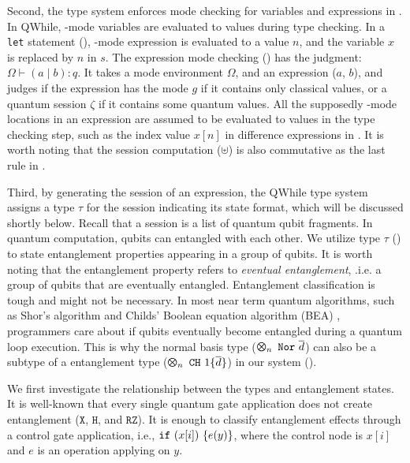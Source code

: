 Second, the type system enforces mode checking for variables and expressions in .
In QWhile, \cmode-mode variables are evaluated to values during type checking.
In a \texttt{let} statement (),
\cmode-mode expression is evaluated to a value $n$, and the variable $x$ is replaced by $n$ in $s$.
The expression mode checking () has the judgment: $\Omega \vdash (a\mid b) : q$. It takes a mode environment $\Omega$, and an expression ($a$, $b$), and judges if the expression has the mode $g$ if it contains only classical values, or a quantum session $\zeta$ if it contains some quantum values. 
All the supposedly \cmode-mode locations in an expression are assumed
to be evaluated to values in the type checking step,
such as the index value $x[n]$ in difference expressions in .
It is worth noting that the session computation ($\uplus$)
is also commutative as the last rule in .

Third, by generating the session of an expression, the QWhile type system assigns a type $\tau$ for the session indicating its state format, which will be discussed shortly below. Recall that a session is a list of quantum qubit fragments.
In quantum computation, qubits can entangled with each other.
We utilize type $\tau$ () to state entanglement properties appearing in a group of qubits.
It is worth noting that the entanglement property refers to \textit{eventual entanglement}, .i.e. a group of qubits that are eventually entangled. Entanglement classification is tough and might not be necessary. In most near term quantum algorithms, such as Shor's algorithm \cite{shors} and Childs' Boolean equation algorithm (BEA) \cite{ChildsNAND}, programmers care about if qubits eventually become entangled during a quantum loop execution. This is why the normal basis type ($\ttype{n}{\tnor{\overline{d}}}$) can also be a subtype of a entanglement type ($\ttype{n}{\tch{1}{\{\overline{d}\}}}$) in our system ().

We first investigate the relationship between the types and entanglement states.
It is well-known that every single quantum gate application
does not create entanglement ($\texttt{X}$, $\texttt{H}$, and $\texttt{RZ}$).
It is enough to classify entanglement effects through a control gate application, i.e., 
$\texttt{if}~{(x[i])}~{\{e(y)\}}$, where the control node is $x[i]$ and $e$ is an operation applying on $y$.

